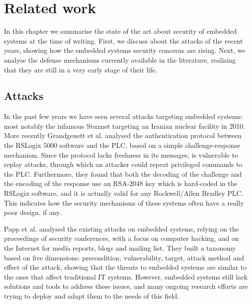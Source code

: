\chapter{Related work}
\label{chap:related}

In this chapter we summarise the state of the art about security of embedded systems at the time of writing.
First, we discuss about the attacks of the recent years, showing how the embedded systems security concerns are rising.
Next, we analyse the defense mechanisms currently available in the literature, realising that they are still in a very early stage of their life.

\section{Attacks}

In the past few years we have seen several attacks targeting embedded systems: most notably the infamous Stuxnet \cite{stuxnet} targeting an Iranian nuclear facility in 2010.
More recently Grandgenett et al. \cite{io-command} analysed the authentication protocol between the RSLogix 5000 software and the PLC, based on a simple challenge-response mechanism.
Since the protocol lacks freshness in its messages, is vulnerable to replay attacks, through which an attacker could repeat privileged commands to the PLC.
Furthermore, they found that both the decoding of the challenge and the encoding of the response use an RSA-2048 key which is hard-coded in the RSLogix software,
and it is actually valid for any Rockwell/Allen Bradley PLC.
This indicates how the security mechanisms of these systems often have a really poor design, if any.

Papp et al. \cite{taxonomy} analysed the existing attacks on embedded systems, relying on the proceedings of security conferences, with a focus on computer hacking,
and on the Internet for media reports, blogs and mailing list.
They built a taxonomy based on five dimensions: precondition, vulnerability, target, attack method and effect of the attack,
showing that the threats to embedded systems are similar to the ones that affect traditional IT systems.
However, embedded systems still lack solutions and tools to address these issues, and many ongoing research efforts are trying to deploy and adapt them to the needs of this field.

